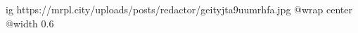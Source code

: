  
 
 
 
 

\ifcmt
  ig https://mrpl.city/uploads/posts/redactor/geityjta9uumrhfa.jpg
  @wrap center
  @width 0.6
\fi
